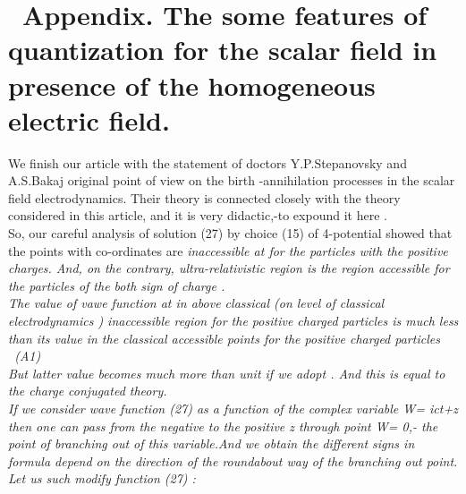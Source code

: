 \documentclass[a4paper,12pt] {article}
\begin{document}
 \section *{\ Appendix.  The some features of quantization for the scalar field in presence of the homogeneous electric field.}
 We finish our article with the statement of doctors Y.P.Stepanovsky and A.S.Bakaj original point of
 view on the birth -annihilation processes in the scalar field
 electrodynamics. Their theory is connected closely with the theory considered in this article, and it is
very didactic,-to expound it here .\\ So, our careful analysis of solution (27) by choice (15) of 4-potential
 \coordHE{}  showed that the points with co-ordinates \coordHE{} are  \it inaccessible \rm at
 \coordHE{} for the particles with the positive charges. And, on the contrary, ultra-relativistic region
\coordHE{} is the region  \it  accessible for the particles of the both sign of charge .\\  \rm The value of
vawe function \coordHE{} at \coordHE{} in above classical (on level of  \it
 classical electrodynamics \rm)  inaccessible region for the  positive charged particles is  \it much less
than its value in the classical accessible points for the  positive charged particles \rm
  \coordHE{} \\ \coordHE{} \ (A1)
\\ But latter value becomes  \it  much more than unit \rm  if we adopt  \coordHE{} . And this is equal to
 the \it  charge conjugated theory.\\  \rm If we consider wave function (27) as a  function of the complex
variable W= ict+z then one can pass from the negative to the positive z through point W= 0,- \it the
  point of branching out of this  variable.\rm  And we obtain the  \it different \rm  signs in formula
 \coordHE{}  \it  depend on the direction of the roundabout way of the branching out point. \\
\rm Let us  such modify  function (27)  :
\\ \coordHE{}
\end{document}
